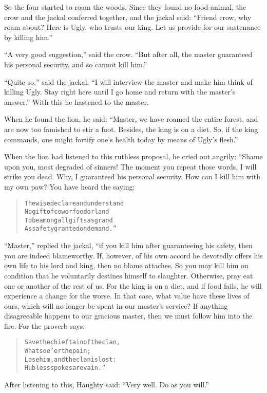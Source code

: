 \documentclass[article, twoside, 14pt]{memoir}
\renewenvironment{verbatim}{%
\begin{quote}%
\vskip -10pt%
\begin{alltt}\normalfont\large}{\end{alltt}%
\end{quote}%
\vskip -10pt
} %
\begin{document}
So the four started to roam the woods. Since they found no
food-animal, the crow and the jackal conferred together, and the
jackal said:
``Friend crow, why roam about? Here is Ugly, who trusts our king. Let us provide for our sustenance by killing him.''

``A very good suggestion,'' said the crow.
``But after all, the master guaranteed his personal security, and so cannot kill him.''

``Quite so,'' said the jackal.
``I will interview the master and make him think of killing Ugly. Stay right here until I go home and return with the master's answer.''
With this he hastened to the master.

When he found the lion, he said:
``Master, we have roamed the entire forest, and are now too famished to stir a foot. Besides, the king is on a diet. So, if the king commands, one might fortify one's health today by means of Ugly's flesh.''

When the lion had listened to this ruthless proposal, he cried out
angrily: “Shame upon you, most degraded of sinners! The moment you
repeat those words, I will strike you dead. Why, I guaranteed his
personal security. How can I kill him with my own paw? You have
heard the saying:

\begin{verbatim}
The wise declare and understand
No gift of cow or food or land
To be among all gifts as grand
As safety granted on demand.”
\end{verbatim}
``Master,'' replied the jackal, “if you kill him after guaranteeing
his safety, then you are indeed blameworthy. If, however, of his
own accord he devotedly offers his own life to his lord and king,
then no blame attaches. So you may kill him on condition that he
voluntarily destines himself to slaughter. Otherwise, pray eat one
or another of the rest of us. For the king is on a diet, and if
food fails, he will experience a change for the worse. In that
case, what value have these lives of ours, which will no longer be
spent in our master's service? If anything disagreeable happens
 to our gracious master, then we must follow him into the
fire. For the proverb says:

\begin{verbatim}
Save the chieftain of the clan,
    Whatsoe'er the pain;
Lose him, and the clan is lost:
    Hubless spokes are vain.”
\end{verbatim}
After listening to this, Haughty said:
``Very well. Do as you will.''
\end{document}
